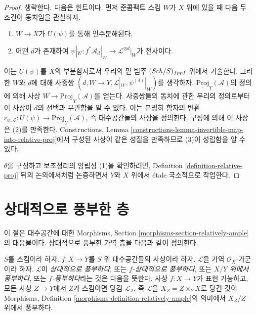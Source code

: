 \begin{proof}
생략한다. 다음은 힌트이다. 먼저 준콤팩트 스킴 $W$가 $X$ 위에 있을 때
다음 두 조건이 동치임을 관찰하자.
\begin{enumerate}
\item $W \to X$가 $U(\psi)$를 통해 인수분해된다.
\item 어떤 $d$가 존재하여
$\psi|_W : f^*\mathcal{A}_d|_W \to \mathcal{L}^{\otimes d}|_W$가
전사이다.
\end{enumerate}
이는 $U(\psi)$를 $X$의 부분함자로서 우리의 밑 범주
$(\mathit{Sch}/S)_{fppf}$ 위에서 기술한다. 그러한 $W$와 $d$에 대해 사중쌍
$(d, W \to Y, \mathcal{L}|_W, \psi^{(d)}|_W)$를 생각하자.
$\underline{\text{Proj}}_Y(\mathcal{A})$의 정의에 의해 사상
$W \to \underline{\text{Proj}}_Y(\mathcal{A})$를 얻는다.
사중쌍들의 동치에 관한 우리의 정의로부터 이 사상이 $d$의 선택과
무관함을 알 수 있다. 이는 분명히 함자의 변환
$r_{\psi, \mathcal{L}} : U(\psi) \to \underline{\text{Proj}}_Y(\mathcal{A})$,
즉 대수공간들의 사상을 정의한다. 구성에 의해 이 사상은 (2)를 만족한다.
Constructions, Lemma
\ref{constructions-lemma-invertible-map-into-relative-proj}에서 구성된
사상이 같은 성질을 만족하므로 (3)이 성립함을 알 수 있다.

\medskip\noindent
$\theta$를 구성하고 보조정리의 양립성 (1)을 확인하려면, Definition
\ref{definition-relative-proj} 뒤의 논의에서처럼 논증하면서
$Y$와 $X$ 위에서 \'etale 국소적으로 작업한다.
\end{proof}

\section{상대적으로 풍부한 층}
\label{section-relatively-ample}

\noindent
이 절은 대수공간에 대한 Morphisms, Section
\ref{morphisms-section-relatively-ample}의 대응물이다. 상대적으로 풍부한
가역 층을 다음과 같이 정의한다.

\begin{definition}
\label{definition-relatively-ample}
$S$를 스킴이라 하자. $f : X \to Y$를 $S$ 위 대수공간들의 사상이라
하자. $\mathcal{L}$을 가역 $\mathcal{O}_X$-가군이라 하자.
$\mathcal{L}$이 {\it 상대적으로 풍부하다}, 또는
{\it $f$-상대적으로 풍부하다}, 또는 {\it $X/Y$ 위에서 풍부하다}, 또는
{\it $f$-풍부하다}라는 것은 다음을 뜻한다. 사상 $f : X \to Y$가 표현
가능하고, 모든 사상 $Z \to Y$에서 $Z$가 스킴이면 당김
$\mathcal{L}_Z$, 즉 $\mathcal{L}$을 $X_Z = Z \times_Y X$로 당긴 것이
Morphisms, Definition
\ref{morphisms-definition-relatively-ample}의 의미에서 $X_Z/Z$ 위에서
풍부하다.
\end{definition}

